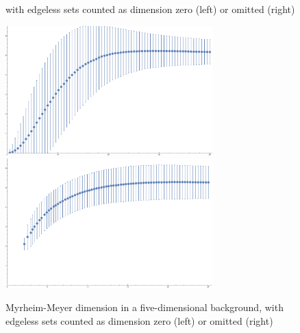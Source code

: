 \documentclass[12pt]{article}
\begin{document}
\begin{figure}
\begin{center}
{with edgeless sets counted as dimension zero (left) or omitted (right) \label{fig3}}
\end{center}
\begin{center}
\includegraphics[width=3.15in]{CSDimRed5D.pdf}
 \includegraphics[width=3.15in]{CSDimRed5D2.pdf}
\caption{Myrheim-Meyer dimension in a five-dimensional background,
with edgeless sets counted as dimension zero (left) or omitted (right) \label{fig4}}
\end{center}
\end{figure}

\newpage

\vspace{1.5ex}



\end{document}
